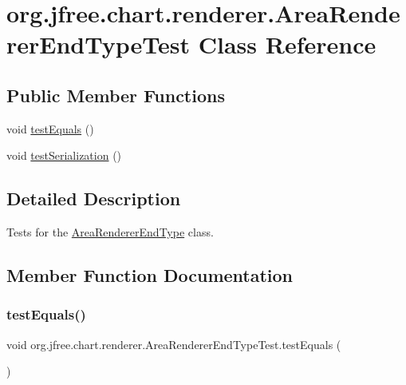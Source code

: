 \hypertarget{classorg_1_1jfree_1_1chart_1_1renderer_1_1_area_renderer_end_type_test}{}\section{org.\+jfree.\+chart.\+renderer.\+Area\+Renderer\+End\+Type\+Test Class Reference}
\label{classorg_1_1jfree_1_1chart_1_1renderer_1_1_area_renderer_end_type_test}
\subsection*{Public Member Functions}
\begin{DoxyCompactItemize}
\item 
void \mbox{\hyperlink{classorg_1_1jfree_1_1chart_1_1renderer_1_1_area_renderer_end_type_test_a4316d188a807616df9acd0850def1078}{test\+Equals}} ()
\item 
void \mbox{\hyperlink{classorg_1_1jfree_1_1chart_1_1renderer_1_1_area_renderer_end_type_test_abdf5bbe21e6b121e00752c69b0065e21}{test\+Serialization}} ()
\end{DoxyCompactItemize}


\subsection{Detailed Description}
Tests for the \mbox{\hyperlink{classorg_1_1jfree_1_1chart_1_1renderer_1_1_area_renderer_end_type}{Area\+Renderer\+End\+Type}} class. 

\subsection{Member Function Documentation}
\mbox{\label{classorg_1_1jfree_1_1chart_1_1renderer_1_1_area_renderer_end_type_test_a4316d188a807616df9acd0850def1078}} 
\subsubsection{\texorpdfstring{test\+Equals()}{testEquals()}}
{\footnotesize\ttfamily void org.\+jfree.\+chart.\+renderer.\+Area\+Renderer\+End\+Type\+Test.\+test\+Equals (\begin{DoxyParamCaption}{ }\end{DoxyParamCaption})}

